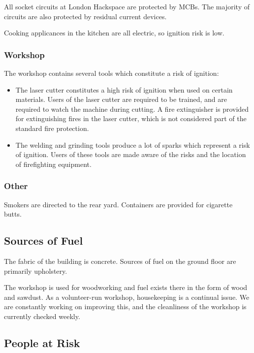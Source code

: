 All socket circuits at London Hackspace are protected by MCBs.
The majority of circuits are also protected by residual current devices.

Cooking applicances in the kitchen are all electric, so ignition risk is
low.

\subsubsection{Workshop}

The workshop contains several tools which constitute a risk of ignition:

\begin{itemize}
\item
  The laser cutter constitutes a high risk of ignition when used on
  certain materials. Users of the laser cutter are required to be
  trained, and are required to watch the machine during cutting. A \COtwo
  fire extinguisher is provided for extinguishing fires in the laser
  cutter, which is not considered part of the standard fire protection.
\item
  The welding and grinding tools produce a lot of sparks which represent
  a risk of ignition. Users of these tools are made aware of the risks
  and the location of firefighting equipment.
\end{itemize}
\subsubsection{Other}

Smokers are directed to the rear yard. Containers are provided for
cigarette butts.

\subsection{Sources of Fuel}

The fabric of the building is concrete. Sources of fuel on the ground
floor are primarily upholstery.

The workshop is used for woodworking and fuel exists there in the form
of wood and sawdust. As a volunteer-run workshop, housekeeping is a
continual issue. We are constantly working on improving this, and the
cleanliness of the workshop is currently checked weekly.

\subsection{People at Risk}

